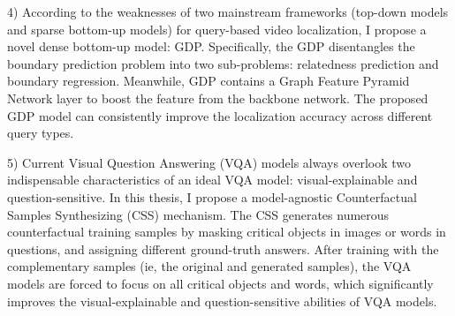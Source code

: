\begin{englishabstract}
4) According to the weaknesses of two mainstream frameworks (top-down models and sparse bottom-up models) for query-based video localization, I propose a novel dense bottom-up model: GDP. Specifically, the GDP disentangles the boundary prediction problem into two sub-problems: relatedness prediction and boundary regression. Meanwhile, GDP contains a Graph Feature Pyramid Network layer to boost the feature from the backbone network. The proposed GDP model can consistently improve the localization accuracy across different query types.

5) Current Visual Question Answering (VQA) models always overlook two indispensable characteristics of an ideal VQA model: visual-explainable and question-sensitive. In this thesis, I propose a model-agnostic Counterfactual Samples Synthesizing (CSS) mechanism. The CSS generates numerous counterfactual training samples by masking critical objects in images or words in questions, and assigning different ground-truth answers. After training with the complementary samples (ie, the original and generated samples), the VQA models are forced to focus on all critical objects and words, which significantly improves the visual-explainable and question-sensitive abilities of VQA models.


\end{englishabstract}
